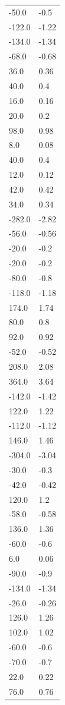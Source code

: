 \begin{longtable}{ll}
-50.0 & -0.5 \\
-122.0 & -1.22 \\
-134.0 & -1.34 \\
-68.0 & -0.68 \\
36.0 & 0.36 \\
40.0 & 0.4 \\
16.0 & 0.16 \\
20.0 & 0.2 \\
98.0 & 0.98 \\
8.0 & 0.08 \\
40.0 & 0.4 \\
12.0 & 0.12 \\
42.0 & 0.42 \\
34.0 & 0.34 \\
-282.0 & -2.82 \\
-56.0 & -0.56 \\
-20.0 & -0.2 \\
-20.0 & -0.2 \\
-80.0 & -0.8 \\
-118.0 & -1.18 \\
174.0 & 1.74 \\
80.0 & 0.8 \\
92.0 & 0.92 \\
-52.0 & -0.52 \\
208.0 & 2.08 \\
364.0 & 3.64 \\
-142.0 & -1.42 \\
122.0 & 1.22 \\
-112.0 & -1.12 \\
146.0 & 1.46 \\
-304.0 & -3.04 \\
-30.0 & -0.3 \\
-42.0 & -0.42 \\
120.0 & 1.2 \\
-58.0 & -0.58 \\
136.0 & 1.36 \\
-60.0 & -0.6 \\
6.0 & 0.06 \\
-90.0 & -0.9 \\
-134.0 & -1.34 \\
-26.0 & -0.26 \\
126.0 & 1.26 \\
102.0 & 1.02 \\
-60.0 & -0.6 \\
-70.0 & -0.7 \\
22.0 & 0.22 \\
76.0 & 0.76 \\

\end{longtable}
